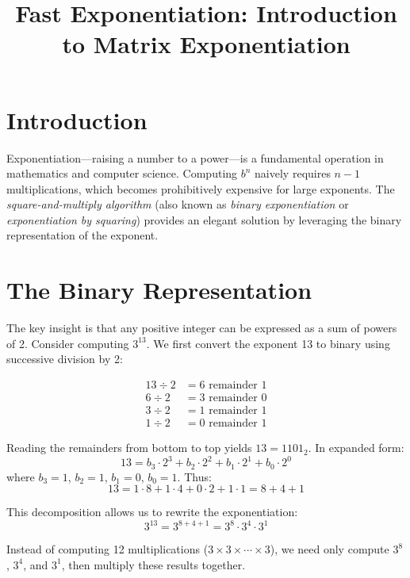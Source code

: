 \documentclass{article}
\begin{document}
	
	\title{Fast Exponentiation: Introduction to Matrix Exponentiation}
	\author{}
	\date{}
	\maketitle
	
	\tableofcontents
	
	\section{Introduction}
	
	Exponentiation---raising a number to a power---is a fundamental operation in mathematics and computer science. Computing $b^n$ naively requires $n-1$ multiplications, which becomes prohibitively expensive for large exponents. The \emph{square-and-multiply algorithm} (also known as \emph{binary exponentiation} or \emph{exponentiation by squaring}) provides an elegant solution by leveraging the binary representation of the exponent.
	
	\section{The Binary Representation}
	
	The key insight is that any positive integer can be expressed as a sum of powers of 2. Consider computing $3^{13}$. We first convert the exponent 13 to binary using successive division by 2:
	
	\begin{align*}
		13 \div 2 &= 6 \text{ remainder } 1 \\
		6 \div 2 &= 3 \text{ remainder } 0 \\
		3 \div 2 &= 1 \text{ remainder } 1 \\
		1 \div 2 &= 0 \text{ remainder } 1
	\end{align*}
	
	Reading the remainders from bottom to top yields $13 = 1101_2$. In expanded form:
	\[
	13 = b_3 \cdot 2^3 + b_2 \cdot 2^2 + b_1 \cdot 2^1 + b_0 \cdot 2^0
	\]
	where $b_3 = 1$, $b_2 = 1$, $b_1 = 0$, $b_0 = 1$. Thus:
	\[
	13 = 1 \cdot 8 + 1 \cdot 4 + 0 \cdot 2 + 1 \cdot 1 = 8 + 4 + 1
	\]
	
	This decomposition allows us to rewrite the exponentiation:
	\[
	3^{13} = 3^{8+4+1} = 3^8 \cdot 3^4 \cdot 3^1
	\]
	
	Instead of computing 12 multiplications ($3 \times 3 \times \cdots \times 3$), we need only compute $3^8$, $3^4$, and $3^1$, then multiply these results together.
	
\end{document}
